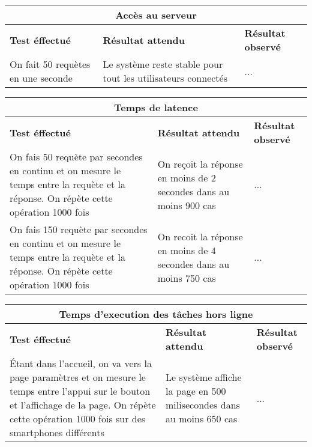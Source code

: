 \documentclass{article}
\begin{document}
  \begin{center}
    \begin{tabular}{|p{5cm}|p{5cm}|p{5cm}|}
      \hline
      \multicolumn{3}{|c|}{\textbf{Accès au serveur}} \\
      \hline
      \textbf{Test éffectué} & \textbf{Résultat attendu} & \textbf{Résultat observé} \\
      \hline

      On fait 50 requètes en une seconde&
      Le système reste stable pour tout les utilisateurs connectés&
      ... \\


      \hline

    \end{tabular}
  \end{center}

  \begin{center}
    \begin{tabular}{|p{5cm}|p{5cm}|p{5cm}|}
      \hline
      \multicolumn{3}{|c|}{\textbf{Temps de latence}} \\
      \hline
      \textbf{Test éffectué} & \textbf{Résultat attendu} & \textbf{Résultat observé} \\
      \hline

      On fais 50 requète par secondes en continu et on mesure le temps entre la requète et la réponse. On répète cette opération 1000 fois&
      On reçoit la réponse en moins de 2 secondes dans au moins 900 cas&
      ... \\

      \hline
      \hline
      On fais 150 requète par secondes en continu et on mesure le temps entre la requète et la réponse. On répète cette opération 1000 fois&
      On recoit la réponse en moins de 4 secondes dans au moins 750 cas&
      ... \\

      \hline

    \end{tabular}
  \end{center}

  \begin{center}
    \begin{tabular}{|p{5cm}|p{5cm}|p{5cm}|}
      \hline
      \multicolumn{3}{|c|}{\textbf{Temps d’execution des tâches hors ligne}} \\
      \hline
      \textbf{Test éffectué} & \textbf{Résultat attendu} & \textbf{Résultat observé} \\
      \hline

      Étant dans l'accueil, on va vers la page paramètres et on mesure le temps entre l'appui sur le bouton et l'affichage de la page. On répète cette opération 1000 fois sur des smartphones différents&
      Le système affiche la page en 500 milisecondes dans au moins 650 cas&
      ... \\


      \hline

    \end{tabular}
  \end{center}
\end{document}
